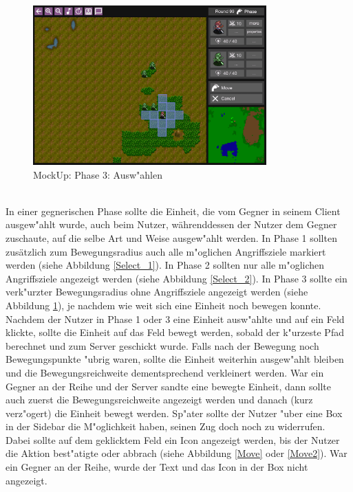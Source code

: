 \documentclass[12pt, titlepage]{scrartcl}
\newcounter{subsubsubsection}[subsubsection]
\begin{document}
			        \begin{figure}[H] 
    				    \centering
    				    \includegraphics[width=0.8\textwidth]{images/mockUps/Select2.png}
    				    \caption{MockUp: Phase 3: Ausw"ahlen}
    				    \label{Select_3}
			        \end{figure} 
		            \ \\ In einer gegnerischen Phase sollte die Einheit, die vom Gegner in seinem Client ausgew"ahlt wurde, auch beim Nutzer, w\"ahrenddessen der Nutzer dem Gegner zuschaute, auf die selbe Art und Weise ausgew"ahlt werden. In Phase 1 sollten zus\"atzlich zum Bewegungsradius auch alle m"oglichen Angriffsziele markiert werden (siehe Abbildung \ref{Select_1}). In Phase 2 sollten nur alle m"oglichen Angriffsziele angezeigt werden (siehe Abbildung \ref{Select_2}). In Phase 3 sollte ein verk"urzter Bewegungsradius ohne Angriffsziele angezeigt werden (siehe Abbildung \ref{Select_3}), je nachdem wie weit sich eine Einheit noch bewegen konnte.
                    Nachdem der Nutzer in Phase 1 oder 3 eine Einheit ausw"ahlte und auf ein Feld klickte, sollte die Einheit auf das Feld bewegt werden, sobald der k"urzeste Pfad berechnet und zum Server geschickt wurde. Falls nach der Bewegung noch Bewegungspunkte "ubrig waren, sollte die Einheit weiterhin ausgew"ahlt bleiben und die Bewegungsreichweite dementsprechend verkleinert werden. War ein Gegner an der Reihe und der Server sandte eine bewegte Einheit, dann sollte auch zuerst die Bewegungsreichweite angezeigt werden und danach (kurz verz"ogert) die Einheit bewegt werden. Sp"ater sollte der Nutzer "uber eine Box in der Sidebar die M"oglichkeit haben, seinen Zug doch noch zu widerrufen. Dabei sollte auf dem geklicktem Feld ein Icon angezeigt werden, bis der Nutzer die Aktion best"atigte oder abbrach (siehe Abbildung \ref{Move} oder \ref{Move2}). War ein Gegner an der Reihe, wurde der Text und das Icon in der Box nicht angezeigt.
\end{document}
